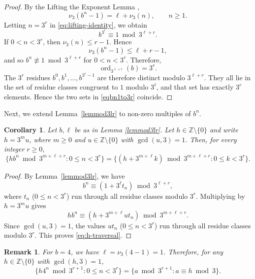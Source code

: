 \documentclass[amssymb,amsfonts,refcheck,12pt,verbatim,righttag]{amsart}
\numberwithin{equation}{section} %
\DeclareMathOperator{\ord}{ord}
\newtheorem{cor}[thm]{Corollary}
\newtheorem{rem}[thm]{Remark}
\newcommand{\Z}{\mathbb{Z}}
\theoremstyle{plain}
\begin{document}
\begin{proof}
	By the Lifting the Exponent Lemma \cite[Theorem 1.37]{Pongsriiam},
	\begin{equation}\label{eq:lifting-identity}
		\nu_3(b^n-1)=\ell+\nu_3(n),
		\qquad n\ge 1.
	\end{equation}
	Letting $n=3^r$ in \eqref{eq:lifting-identity},  we obtain
	\[
	b^{3^r}\equiv 1 \bmod{3^{\ell+r}}.
	\]
	If $0<n<3^r$, then $\nu_3(n)\leq r-1$. Hence
	\[
	\nu_3(b^n-1)\leq \ell+r-1,\]
	and so $b^n\not\equiv 1\bmod {3^{\ell+r}}$ for $0<n<3^r$.  Therefore,
\begin{equation*}
		\ord_{3^{\ell+r}}(b)=3^r.
	\end{equation*}
	The $3^r$ residues $b^0,b^1,\ldots,b^{3^r-1}$ are therefore distinct modulo $3^{\ell+r}$.  They all lie in the set of residue classes congruent to $1$ modulo $3^\ell$, and that set has exactly $3^r$ elements.  Hence the two sets in \eqref{eqbn1to3r} coincide.
\end{proof}

Next, we extend  Lemma~\ref{lemmod3lr} to non-zero multiples of $b^n$. 

\begin{cor}\label{corhbnmod}
	Let $b,\ell$ be as in Lemma \ref{lemmod3lr}. Let $h\in\Z\setminus\{0\}$ and write $
	h=3^m u$, where $m\geq 0$ and $u\in\Z\setminus\{0\}$ with $ \gcd(u,3)=1$. Then, for every integer $r\ge 0$,
\begin{equation}\label{eq:h-traversal}
		\{h b^n\bmod{3^{m+\ell+r}}: 0\leq n<3^r\}
		=
		\{(h+3^{m+\ell}k)\bmod{3^{m+\ell+r}}:0\leq k<3^r\}.
	\end{equation}
	\end{cor}

\begin{proof} 
	By Lemma~\ref{lemmod3lr}, we have
	\[
	b^n\equiv (1+3^\ell t_n) \bmod {3^{\ell+r}},
	\]
where $t_n$ ($0\leq n<3^r$) run through all residue classes modulo $3^r$. 
	Multiplying by $h=3^m u$ gives
	\[
	h b^n \equiv (h + 3^{m+\ell}ut_n)
	\bmod{3^{m+\ell+r}}.
	\]
	Since $\gcd(u,3)=1$,  the values $ut_n$ ($0\leq n<3^r$) run through all residue classes modulo $3^r$.  This proves \eqref{eq:h-traversal}.  
\end{proof}

\begin{rem}\label{remb4case}
	For $b=4$, we  have $\ell=\nu_3(4-1)=1$.  Therefore, for any $h\in\Z\setminus\{0\}$ with $\gcd(h,3)=1$,
	\begin{equation*}
		\{h4^n \bmod 3^{r+1}:0\leq n<3^r\}
		=
		\{a\bmod{3^{r+1}}:a\equiv h\bmod{3}\}.
	\end{equation*}
\end{rem}
\end{document}

